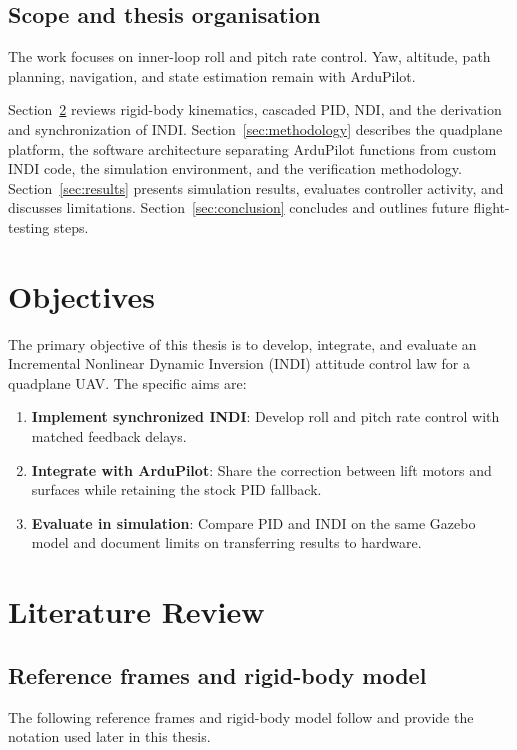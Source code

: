 \documentclass{article}
\begin{document}
\subsection{Scope and thesis organisation}
\label{sec:scope}
The work focuses on inner-loop roll and pitch rate control. Yaw, altitude, path planning, navigation, and state estimation remain with ArduPilot.

Section~\ref{sec:litreview} reviews rigid-body kinematics, cascaded PID, NDI, and the derivation and synchronization of INDI. Section~\ref{sec:methodology} describes the quadplane platform, the software architecture separating ArduPilot functions from custom INDI code, the simulation environment, and the verification methodology. Section~\ref{sec:results} presents simulation results, evaluates controller activity, and discusses limitations. Section~\ref{sec:conclusion} concludes and outlines future flight-testing steps.

\section{Objectives}
\label{sec:aims}
The primary objective of this thesis is to develop, integrate, and evaluate an Incremental Nonlinear Dynamic Inversion (INDI) attitude control law for a quadplane UAV. The specific aims are:
\begin{enumerate}
    \item \textbf{Implement synchronized INDI}: Develop roll and pitch rate control with matched feedback delays.
    \item \textbf{Integrate with ArduPilot}: Share the correction between lift motors and surfaces while retaining the stock PID fallback.
    \item \textbf{Evaluate in simulation}: Compare PID and INDI on the same Gazebo model and document limits on transferring results to hardware.
\end{enumerate}


\section{Literature Review}
\label{sec:litreview}

\subsection{Reference frames and rigid-body model}
\label{sec:sixdof}
The following reference frames and rigid-body model follow \citet{beardmclain2012} and provide the notation used later in this thesis.
\end{document}
